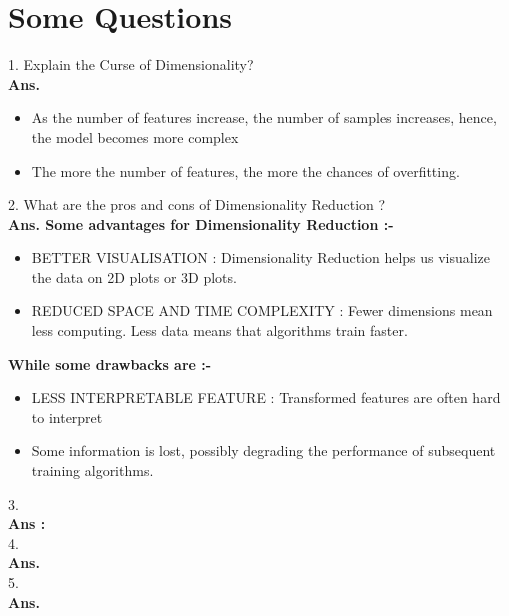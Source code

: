 \documentclass[a4paper, 11pt]{article}
\begin{document}
\section{Some Questions}
1. Explain the Curse of Dimensionality?\\
\textbf{Ans.}  \begin{itemize}
    \item  As the number of features increase, the number of samples increases, hence, the model becomes more complex
    \item The more the number of features, the more the chances of overfitting. 
\end{itemize}
2. What are the pros and cons of Dimensionality Reduction ? \\
\textbf{Ans. Some advantages for Dimensionality Reduction :-} 
\begin{itemize}
\item BETTER VISUALISATION : Dimensionality Reduction helps us visualize the data on 2D plots or 3D plots.
 \item REDUCED SPACE AND TIME COMPLEXITY : Fewer dimensions mean less computing. Less data means that algorithms train faster.
\end{itemize}
\pagebreak
\textbf{While some drawbacks are :-}
\begin{itemize}
    \item LESS INTERPRETABLE FEATURE : Transformed features are often hard to interpret
     \item Some information is lost, possibly degrading the performance of subsequent training algorithms.
    \end{itemize}
3. \\ 
\textbf{Ans :}\\
4.   \\
\textbf{Ans.} \\
5.  
\\ \textbf{Ans. } \\

\end{document}
